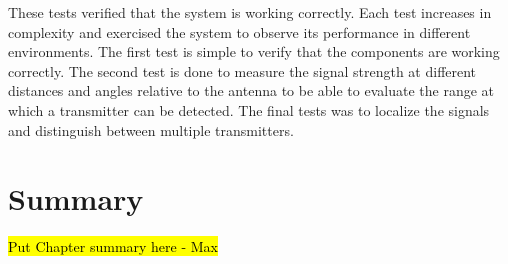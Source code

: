 These tests verified that the system is working correctly. Each test increases in complexity and exercised the system to observe its performance in different environments. The first test is simple to verify that the components are working correctly. The second test is done to measure the signal strength at different distances and angles relative to the antenna to be able to evaluate the range at which a transmitter can be detected. The final tests was to localize the signals and distinguish between multiple transmitters.

\section{Summary}
\hl{Put Chapter summary here - Max}
